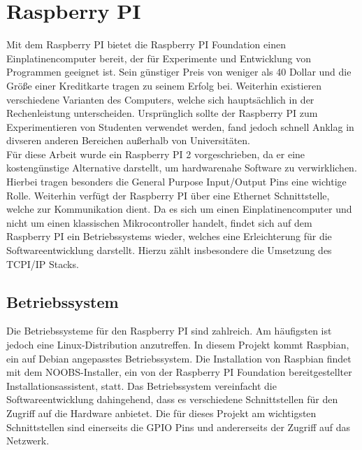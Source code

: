 \chapter{Raspberry PI}
\label{raspi}
Mit dem Raspberry PI bietet die Raspberry PI Foundation einen Einplatinencomputer bereit, der für Experimente und Entwicklung von Programmen geeignet ist. Sein günstiger Preis von weniger als 40 Dollar und die Größe einer Kreditkarte tragen zu seinem Erfolg bei. Weiterhin existieren verschiedene Varianten des Computers, welche sich hauptsächlich in der Rechenleistung unterscheiden. Ursprünglich sollte der Raspberry PI zum Experimentieren von Studenten verwendet werden, fand jedoch schnell Anklag in divseren anderen Bereichen außerhalb von Universitäten.\\ %
Für diese Arbeit wurde ein Raspberry PI 2 vorgeschrieben, da er eine kostengünstige Alternative darstellt, um hardwarenahe Software zu verwirklichen. Hierbei tragen besonders die General Purpose Input/Output Pins eine wichtige Rolle. Weiterhin verfügt der Raspberry PI über eine Ethernet Schnittstelle, welche zur Kommunikation dient. Da es sich um einen Einplatinencomputer und nicht um einen klassischen Mikrocontroller handelt, findet sich auf dem Raspberry PI ein Betriebssystems wieder, welches eine Erleichterung für die Softwareentwicklung darstellt. Hierzu zählt insbesondere die Umsetzung des TCPI/IP Stacks.\\ %

\section{Betriebssystem}
\label{os}
Die Betriebssysteme für den Raspberry PI sind zahlreich. Am häufigsten ist jedoch eine Linux-Distribution anzutreffen. In diesem Projekt kommt Raspbian, ein auf Debian angepasstes Betriebssystem. Die Installation von Raspbian findet mit dem NOOBS-Installer, ein von der Raspberry PI Foundation bereitgestellter Installationsassistent, statt. %
Das Betriebssystem vereinfacht die Softwareentwicklung dahingehend, dass es verschiedene Schnittstellen für den Zugriff auf die Hardware anbietet. Die für dieses Projekt am wichtigsten Schnittstellen sind einerseits die GPIO Pins und andererseits der Zugriff auf das Netzwerk.

